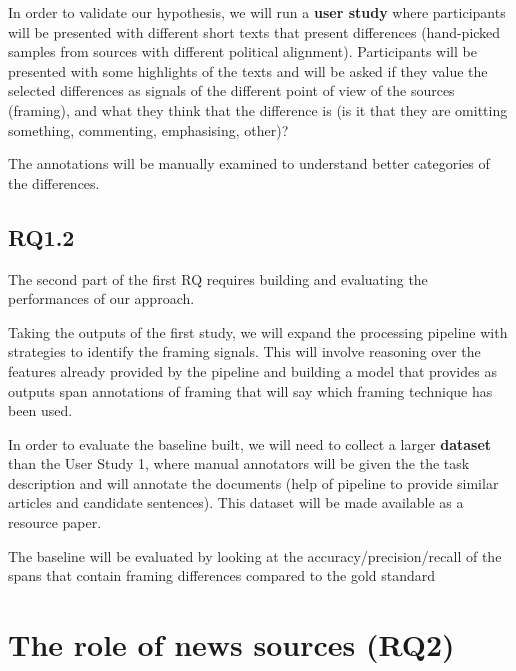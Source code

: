 

In order to validate our hypothesis, we will run a \textbf{user study} where participants will be presented with different short texts that present differences (hand-picked samples from sources with different political alignment).
Participants will be presented with some highlights of the texts and will be asked if they value the selected differences as signals of the different point of view of the sources (framing), and what they think that the difference is (is it that they are omitting something, commenting, emphasising, other)?

The annotations will be manually examined to understand better categories of the differences.


\subsection{RQ1.2}

The second part of the first RQ requires building and evaluating the performances of our approach.

Taking the outputs of the first study, we will expand the processing pipeline with strategies to identify the framing signals. This will involve reasoning over the features already provided by the pipeline and building a model that provides as outputs span annotations of framing that will say which framing technique has been used.

In order to evaluate the baseline built, we will need to collect a larger \textbf{dataset} than the User Study 1, where manual annotators will be given the the task description and will annotate the documents (help of pipeline to provide similar articles and candidate sentences).
This dataset will be made available as a resource paper.

The baseline will be evaluated by looking at the accuracy/precision/recall of the spans that contain framing differences compared to the gold standard




\section{The role of news sources (RQ2)}
\label{sec:prop_rq2}

